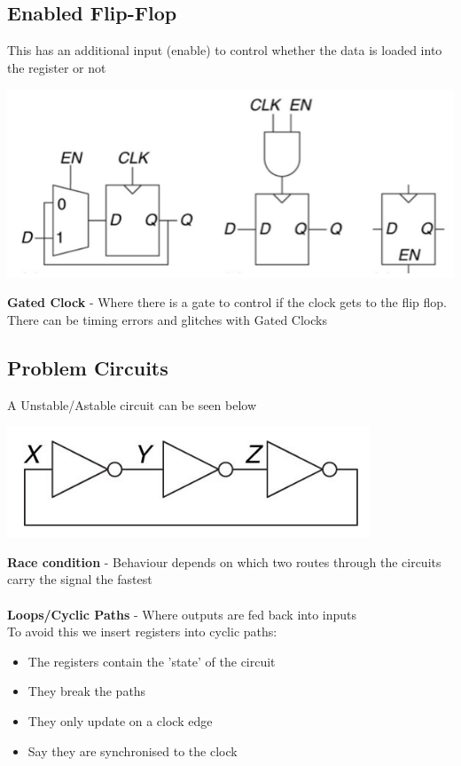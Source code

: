 \documentclass{article}[18pt]
\begin{document}
\subsection{Enabled Flip-Flop}
This has an additional input (enable) to control whether the data is loaded into the register or not
\begin{center}
	\includegraphics[scale=0.7]{"Enabled Flip-Flop"}
\end{center}
\textbf{Gated Clock} - Where there is a gate to control if the clock gets to the flip flop.\\
There can be timing errors and glitches with Gated Clocks
\subsection{Problem Circuits}
A Unstable/Astable circuit can be seen below
\begin{center}
	\includegraphics[scale=0.7]{Unstable}
\end{center}
\textbf{Race condition} - Behaviour depends on which two routes through the circuits carry the signal the fastest\\
\\
\textbf{Loops/Cyclic Paths} - Where outputs are fed back into inputs\\
To avoid this we insert registers into cyclic paths:
\begin{itemize}
	\item The registers contain the 'state' of the circuit
	\item They break the paths
	\item They only update on a clock edge
	\item Say they are synchronised to the clock
\end{itemize}
\end{document}
